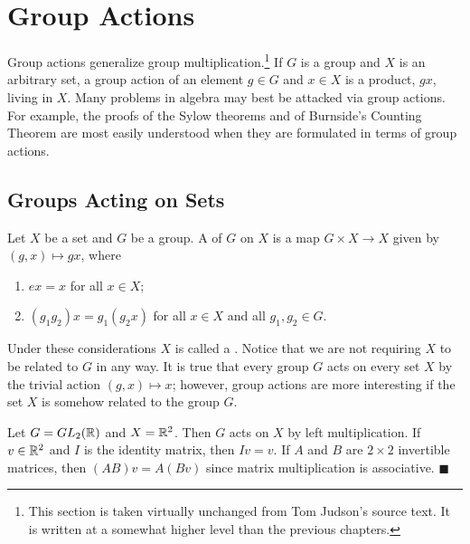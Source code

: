 \chapter{Group Actions}\label{actions}

Group actions generalize group multiplication.\footnote{This section is taken virtually unchanged from Tom Judson's source text. It is written at a somewhat higher level than the previous chapters.}  If $G$ is a group and $X$ is an arbitrary set, a group action of an element $g \in G$ and $x \in X$ is a product, $gx$,  living in $X$.  Many problems in algebra may best be attacked via group actions.  For example, the proofs of the Sylow theorems and of Burnside's Counting Theorem are most easily understood when they are formulated in terms of group actions. 


\section{Groups Acting on Sets}

Let $X$ be a set and $G$ be a group.  A   of $G$ on $X$ is a map $G \times X \rightarrow X$ given by $(g,x) \mapsto gx$, where 
\begin{enumerate}
 
\item 
$ex = x$ for all $x \in X$;
 
\item 
$(g_1 g_2)x = g_1(g_2 x)$ for all $x \in X$ and all $g_1, g_2 \in G$. 
 
\end{enumerate}
Under these considerations $X$ is called a .  Notice that we are not requiring $X$ to be related to $G$ in any way.  It is true that every group $G$ acts on every set $X$ by the trivial action $(g,x) \mapsto x$; however, group actions are more interesting if the set $X$ is somehow related to the group $G$. 

\medskip
 
Let $G = GL_2( {\Bbb R} )$ and $X = {\Bbb R}^2$. Then $G$ acts on $X$ by left multiplication.  If $v \in {\Bbb R}^2$ and $I$ is the identity matrix, then $Iv = v$.  If $A$ and $B$ are $2 \times 2$ invertible matrices, then $(AB)v = A(Bv)$ since matrix multiplication is
associative. 
\hspace{\fill} $\blacksquare$

